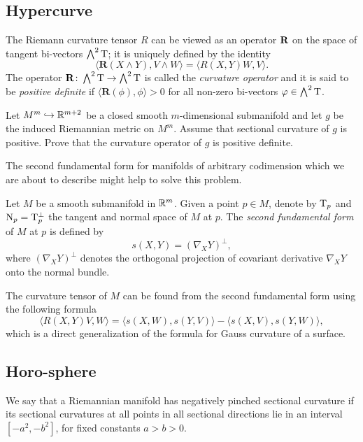 \subsection*{Hypercurve}
\label{codim=2}

The Riemann curvature tensor $R$
can be viewed as an operator $\text{\bf R}$ on the space of tangent bi-vectors $\bigwedge^2 \mathrm{T}$;
it is uniquely defined by the identity
$$\langle\mathbf{R}(X\wedge Y),V\wedge W\rangle
=
\langle R(X,Y)W,V\rangle.$$
The operator $\mathbf{R}\colon\bigwedge^2 \mathrm{T}\to \bigwedge^2 \mathrm{T}$ is called the \emph{curvature operator} and it is said to be {}\emph{positive definite} if
$\langle\mathbf{R}(\phi),\phi\rangle>0$ for all non-zero
bi-vectors $\varphi\in\bigwedge^2 \mathrm{T}$.


\begin{pr}
Let $M^m\hookrightarrow \mathbb{R}^{m+2}$ be a closed smooth $m$-dimensional
submanifold and let  $g$ be the  induced Riemannian metric on $M^m$.
Assume that sectional curvature of $g$ is positive.
Prove that the curvature operator of $g$ is positive definite.
\end{pr}

The second fundamental form for manifolds of arbitrary codimension which we are about to describe might help to solve this problem.

Let $M$ be a smooth submanifold in $\mathbb{R}^m$.
Given a point $p\in M$, denote by $\mathrm{T}_p$ and $\mathrm{N}_p=\mathrm{T}_p^\bot$
the tangent and normal space of $M$ at $p$.
The \emph{second fundamental form}\label{page:second fundamental form} of $M$ at $p$ is defined by 
\[s(X,Y)=(\nabla_X Y)^\bot,\]
where $(\nabla_X Y)^\bot$ denotes the orthogonal projection of covariant derivative $\nabla_X Y$ onto the normal bundle.

The curvature tensor of $M$ can be found from the second fundamental form using the following  formula
\[\langle R(X,Y)V,W\rangle=\langle s(X,W),s(Y,V)\rangle-\langle s(X,V),s(Y,W)\rangle,\]
which is a direct generalization of the formula for Gauss curvature of a surface.


\subsection*{Horo-sphere}
\label{Horosphere}

We say that a Riemannian manifold has negatively pinched sectional curvature if its sectional curvatures at all points in all sectional directions lie in an interval $[-a^2, -b^2]$, for fixed constants $a>b>0$.

